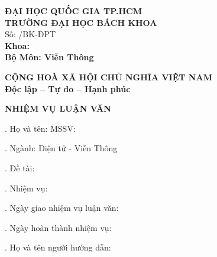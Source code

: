 
\thispagestyle{empty}

\begin{center}
\begin{minipage}[t]{0.48\textwidth}
\centering
\textbf{\small ĐẠI HỌC QUỐC GIA TP.HCM} \\
\textbf{\small TRƯỜNG ĐẠI HỌC BÁCH KHOA} \\
\vspace{0.2cm}
\noindent Số: \underline{\hspace{3cm}} /BK-ĐPT \\[0.2cm]
\textbf{\small Khoa: \DEPARTMENT} \\
\textbf{\small Bộ Môn: Viễn Thông}
\end{minipage}
\hfill
\begin{minipage}[t]{0.48\textwidth}
\centering
\textbf{\small CỘNG HOÀ XÃ HỘI CHỦ NGHĨA VIỆT NAM} \\
\textbf{\small Độc lập -- Tự do -- Hạnh phúc}
\end{minipage}
\end{center}

\vspace{0.6cm}

\begin{center}
\textbf{\large NHIỆM VỤ LUẬN VĂN}
\end{center}

\vspace{0.5cm}

. Họ và tên: \TENTACGIA \hspace{2cm} MSSV: \MSSV

\vspace{0.2cm}
. Ngành: Điện tử - Viễn Thông

\vspace{0.2cm}
. Đề tài: \TENLUANVAN

\vspace{0.2cm}
. Nhiệm vụ: \dotfill

\vspace{0.4cm}
. Ngày giao nhiệm vụ luận văn: \dotfill

\vspace{0.2cm}
. Ngày hoàn thành nhiệm vụ: \dotfill

\vspace{0.2cm}
. Họ và tên người hướng dẫn: \TENCANBO

